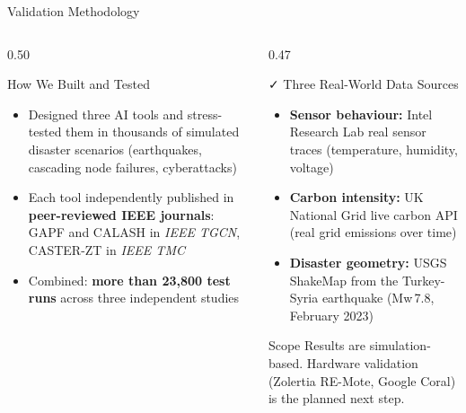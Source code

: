 \documentclass[aspectratio=169,t,10pt]{beamer}
\begin{document}
\begin{frame}[shrink=5]{Validation Methodology}
\begin{columns}[T]
\begin{column}{0.50\textwidth}
  \begin{block}{\faGlobe\; How We Built and Tested}
    \begin{itemize}\small\setlength{\itemsep}{4pt}
      \item Designed three AI tools and stress-tested them
            in thousands of simulated disaster scenarios
            (earthquakes, cascading node failures, cyberattacks)
      \item Each tool independently published in
            \textbf{peer-reviewed IEEE journals}:\\
            GAPF and CALASH in \textit{IEEE TGCN},\\
            CASTER-ZT in \textit{IEEE TMC}
      \item Combined: \textbf{more than 23,800 test runs}
            across three independent studies
    \end{itemize}
  \end{block}
\end{column}
\begin{column}{0.47\textwidth}
  \begin{block}{\faCheck\; Three Real-World Data Sources}
    \begin{itemize}\small\setlength{\itemsep}{4pt}
      \item \textbf{Sensor behaviour:}
            Intel Research Lab real sensor traces
            (temperature, humidity, voltage)
      \item \textbf{Carbon intensity:}
            UK National Grid live carbon API
            (real grid emissions over time)
      \item \textbf{Disaster geometry:}
            USGS ShakeMap from the Turkey-Syria earthquake
            (Mw\,7.8, February 2023)
    \end{itemize}
  \end{block}
  \vspace{3pt}
  \begin{alertblock}{Scope}
    \small Results are simulation-based.
    Hardware validation (Zolertia RE-Mote, Google Coral)
    is the planned next step.
  \end{alertblock}
\end{column}
\end{columns}
\end{frame}
\end{document}
